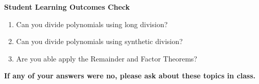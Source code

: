 \noindent \textbf{Student Learning Outcomes Check}

\begin{enumerate}
\item Can you divide polynomials using long division?
\item Can you divide polynomials using synthetic division?
\item Are you able apply the Remainder and Factor Theorems?

\end{enumerate}

\noindent \textbf{If any of your answers were no, please ask about these topics in class.}

